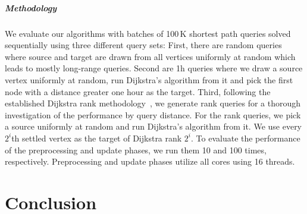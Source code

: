 \documentclass[a4paper,UKenglish,cleveref, autoref, thm-restate]{lipics-v2021}
\begin{document}

\subparagraph{Methodology}
We evaluate our algorithms with batches of 100\,K shortest path queries solved sequentially using three different query sets:
First, there are random queries where source and target are drawn from all vertices uniformly at random which leads to mostly long-range queries.
Second are 1h queries where we draw a source vertex uniformly at random, run Dijkstra's algorithm from it and pick the first node with a distance greater one hour as the target.
Third, following the established Dijkstra rank methodology~\cite{}, we generate rank queries for a thorough investigation of the performance by query distance.
For the rank queries, we pick a source uniformly at random and run Dijkstra's algorithm from it.
We use every $2^{i}$th settled vertex as the target of Dijkstra rank $2^i$.
To evaluate the performance of the preprocessing and update phases, we run them 10 and 100 times, respectively.
Preprocessing and update phases utilize all cores using 16 threads.

\section{Conclusion}

\end{document}
